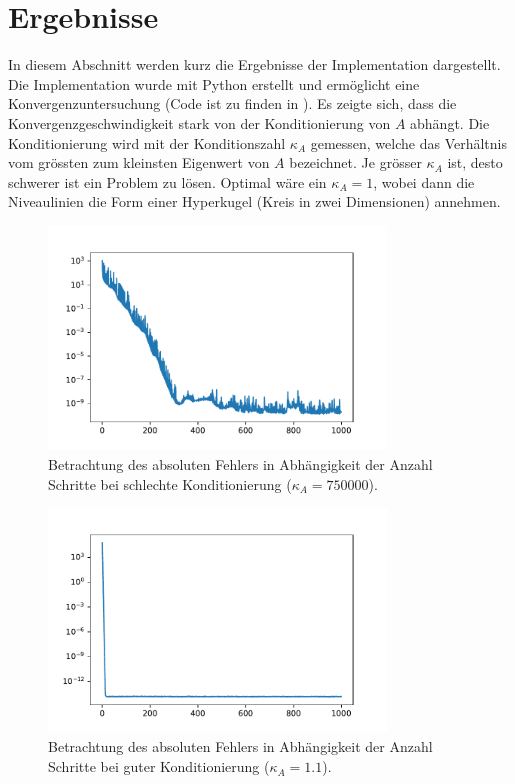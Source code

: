 \section{Ergebnisse}
\label{cg:section:ergebnisse}

In diesem Abschnitt werden kurz die Ergebnisse der Implementation dargestellt.
Die Implementation wurde mit Python erstellt und ermöglicht eine Konvergenzuntersuchung (Code ist zu finden in \cite{cg:online:code}).
%
Es zeigte sich, dass die Konvergenzgeschwindigkeit stark von der Konditionierung von $A$ abhängt.
%
Die Konditionierung wird mit der Konditionszahl $\kappa_A$ gemessen, welche das Verhältnis vom grössten zum kleinsten Eigenwert von $A$ bezeichnet.
%
Je grösser $\kappa_A$ ist, desto schwerer ist ein Problem zu lösen.
Optimal wäre ein $\kappa_A = 1$, wobei dann die Niveaulinien die Form einer Hyperkugel (Kreis in zwei Dimensionen) annehmen.
%
%
\begin{figure}	
\centering
\includegraphics[width=0.8\textwidth]{papers/cg/images/convergence_k_750000}
\caption{Betrachtung des absoluten Fehlers in Abhängigkeit der
Anzahl Schritte bei schlechte Konditionierung ($\kappa_A=750000$).}
\label{cg:abb:slow_conv}
\end{figure}
\begin{figure}	
\centering
\includegraphics[width=0.8\textwidth]{papers/cg/images/convergence_k_1_1}
\caption{Betrachtung des absoluten Fehlers in Abhängigkeit der
Anzahl Schritte bei guter Konditionierung ($\kappa_A=1.1$).}
\label{cg:abb:fast_conv}
\end{figure}


